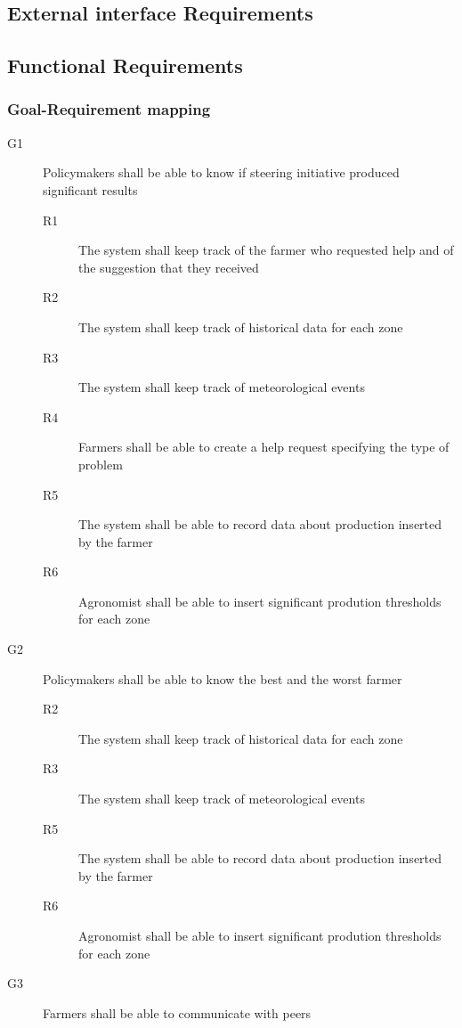\subsection{External interface Requirements}
\subsection{Functional Requirements}
\subsubsection{Goal-Requirement mapping}
\begin{description}
    \item [G1] Policymakers shall be able to know if steering initiative produced significant results
        \begin{description}
            \item[R1] The system shall keep track of the farmer who requested help and of the suggestion that they received
            \item[R2] The system shall keep track of historical data for each zone
            \item[R3] The system shall keep track of meteorological events
            \item[R4] Farmers shall be able to create a help request specifying  the type of problem
            \item[R5] The system shall be able to record data about production inserted by the farmer
            \item[R6] Agronomist shall be able to insert significant prodution thresholds for each zone   
        \end{description}
    \item [G2] Policymakers shall be able to know the best and the worst farmer
        \begin{description}
            \item[R2] The system shall keep track of historical data for each zone
            \item[R3] The system shall keep track of meteorological events
            \item[R5] The system shall be able to record data about production inserted by the farmer
            \item[R6] Agronomist shall be able to insert significant prodution thresholds for each zone   
        \end{description}
    \item [G3] Farmers shall be able to communicate with peers

\end{description}
